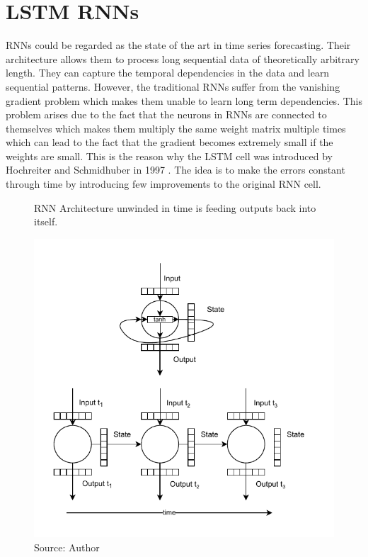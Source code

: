\section{\acl{LSTM} \acl{RNN}s}

\acl{RNN}s could be regarded as the state of the art in time series forecasting.
Their architecture allows them to process long sequential data
of theoretically arbitrary length. They can capture the temporal dependencies
in the data and learn sequential patterns. However, the traditional \ac{RNN}s
suffer from the vanishing gradient problem which makes them unable to learn 
long term dependencies. This problem arises
due to the fact that the neurons in \ac{RNN}s are connected to themselves
which makes them multiply the same weight matrix multiple
times which can lead to the fact that the gradient becomes extremely small if the 
weights are small. This is the reason why the \ac{LSTM} cell was
introduced by Hochreiter and Schmidhuber in 1997 \cite{Hochreiter1997}.
The idea is to make the errors constant through time by introducing few improvements
to the original \ac{RNN} cell.

\begin{figure}[!h]
    \centering
    \caption{\acl{RNN} Architecture unwinded in time 
    is feeding outputs back into itself.}
    \includegraphics[width=1\textwidth]{Figures/RNN.drawio.pdf}
    \caption*{Source: Author}
    \label{fig:rnn_architecture}
\end{figure}

